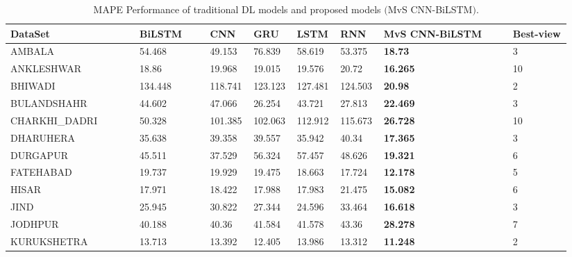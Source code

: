   \begin{landscape}
    \setlength{\tabcolsep}{3pt}
  
    {\renewcommand{\arraystretch}{1}%
    \begin{longtable}[h!]{ p{0.22\linewidth} p{0.12\linewidth} p{0.07\linewidth} p{0.07\linewidth}  p{0.07\linewidth} p{0.07\linewidth} p{0.22\linewidth}  p{0.1\linewidth}}%
      \caption{MAPE Performance of traditional DL models and proposed models $($MvS CNN-BiLSTM$)$.}
      \label{tab: MAPE}\\
    \hline  DataSet        & BiLSTM  & CNN & GRU      & LSTM & RNN      & MvS CNN-BiLSTM        & Best-view \\ \hline
    \endhead
    \hline
    \endfoot
    \endlastfoot
    AMBALA         & 54.468       & 49.153    & 76.839    & 58.619     & 53.375    & \textbf{18.73}  & 3      \\
    ANKLESHWAR     & 18.86        & 19.968    & 19.015    & 19.576     & 20.72     & \textbf{16.265} & 10     \\
    BHIWADI        & 134.448      & 118.741   & 123.123   & 127.481    & 124.503   & \textbf{20.98}  & 2      \\
    BULANDSHAHR    & 44.602       & 47.066    & 26.254    & 43.721     & 27.813    & \textbf{22.469} & 3      \\
    CHARKHI\_DADRI & 50.328       & 101.385   & 102.063   & 112.912    & 115.673   & \textbf{26.728} & 10     \\
    DHARUHERA      & 35.638       & 39.358    & 39.557    & 35.942     & 40.34     & \textbf{17.365} & 3      \\
    DURGAPUR       & 45.511       & 37.529    & 56.324    & 57.457     & 48.626    & \textbf{19.321} & 6      \\
    FATEHABAD      & 19.737       & 19.929    & 19.475    & 18.663     & 17.724    & \textbf{12.178} & 5      \\
    HISAR          & 17.971       & 18.422    & 17.988    & 17.983     & 21.475    & \textbf{15.082} & 6      \\
    JIND           & 25.945       & 30.822    & 27.344    & 24.596     & 33.464    & \textbf{16.618} & 3      \\
    JODHPUR        & 40.188       & 40.36     & 41.584    & 41.578     & 43.36     & \textbf{28.278} & 7      \\
    KURUKSHETRA    & 13.713       & 13.392    & 12.405    & 13.986     & 13.312    & \textbf{11.248} & 2      \\

\end{longtable}}
\end{landscape}
